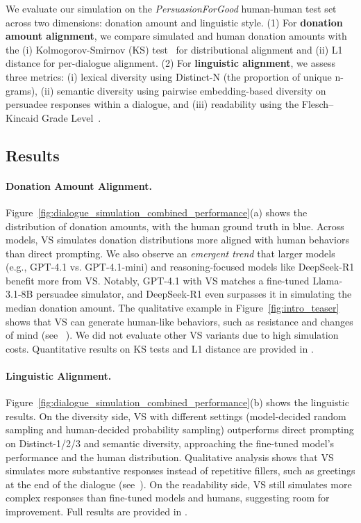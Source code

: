 We evaluate our simulation on the \textit{PersuasionForGood} human-human test set across two dimensions: donation amount and linguistic style. (1) For \textbf{donation amount alignment}, we compare simulated and human donation amounts with the (i) Kolmogorov-Smirnov (KS) test~\citep{ks-test} for distributional alignment and (ii) L1 distance for per-dialogue alignment. (2) For \textbf{linguistic alignment}, we assess three metrics: (i) lexical diversity using Distinct-N (the proportion of unique n-grams), (ii) semantic diversity using pairwise embedding-based diversity on persuadee responses within a dialogue, and (iii) readability using the Flesch–Kincaid Grade Level~\citep{flesch1948new}.


\vspace{-0.5em}

\subsection{Results}
\vspace{-0.5em}
\paragraph{Donation Amount Alignment.} Figure~\ref{fig:dialogue_simulation_combined_performance}(a) shows the distribution of donation amounts, with the human ground truth in blue. Across models, VS simulates donation distributions more aligned with human behaviors than direct prompting. We also observe an \emph{emergent trend} that larger models (e.g., GPT-4.1 vs. GPT-4.1-mini) and reasoning-focused models like DeepSeek-R1 benefit more from VS. Notably, GPT-4.1 with VS matches a fine-tuned Llama-3.1-8B persuadee simulator, and DeepSeek-R1 even surpasses it in simulating the median donation amount. The qualitative example in Figure~\ref{fig:intro_teaser} shows that VS can generate human-like behaviors, such as resistance and changes of mind (see ~). We did not evaluate other VS variants due to high simulation costs. Quantitative results on KS tests and L1 distance are provided in . 

\paragraph{Linguistic Alignment.}  Figure~\ref{fig:dialogue_simulation_combined_performance}(b) shows the linguistic results. On the diversity side,  VS with different settings (model-decided random sampling and human-decided probability sampling) outperforms direct prompting on Distinct-1/2/3 and semantic diversity,  approaching the fine-tuned model's performance and the human distribution. 
Qualitative analysis shows that VS simulates more substantive responses instead of repetitive fillers, such as greetings at the end of the dialogue (see~).
On the readability side, VS  still simulates more complex responses than fine-tuned models and humans, suggesting room for improvement. 
Full results are provided in .

